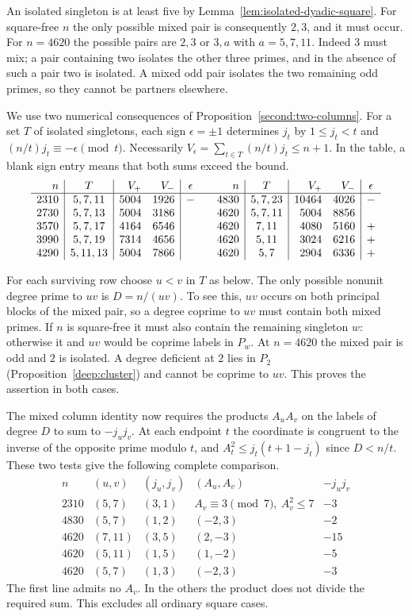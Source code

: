 \documentclass[11pt,a4paper]{article}
\numberwithin{equation}{section}
\theoremstyle{remark}
\begin{document}
An isolated singleton is at least five by Lemma~\ref{lem:isolated-dyadic-square}.
For square-free $n$ the only possible mixed pair is consequently
$2,3$, and it must occur. For $n=4620$ the possible pairs are $2,3$
or $3,a$ with $a=5,7,11$. Indeed $3$ must mix; a pair containing two
isolates the other three primes, and in the absence of such a pair
two is isolated. A mixed odd pair isolates the two remaining odd
primes, so they cannot be partners elsewhere.

We use two numerical consequences of Proposition~\ref{second:two-columns}.
For a set $T$ of isolated singletons, each sign $\epsilon=\pm1$
determines $j_t$ by $1\le j_t<t$ and $(n/t)j_t\equiv-\epsilon\pmod t$.
Necessarily $V_\epsilon=\sum_{t\in T}(n/t)j_t\le n+1$.
In the table, a blank sign entry means that both sums exceed the bound.
\[
\begin{array}{r|c|rr|c@{\qquad}r|c|rr|c}
 n&T&V_+&V_-&\epsilon &n&T&V_+&V_-&\epsilon\\\hline
2310&5,7,11&5004&1926&- &4830&5,7,23&10464&4026&-\\
2730&5,7,13&5004&3186& &4620&5,7,11&5004&8856&\\
3570&5,7,17&4164&6546& &4620&7,11&4080&5160&+\\
3990&5,7,19&7314&4656& &4620&5,11&3024&6216&+\\
4290&5,11,13&5004&7866& &4620&5,7&2904&6336&+
\end{array}
\]

For each surviving row choose $u<v$ in $T$ as below. The only possible
nonunit degree prime to $uv$ is $D=n/(uv)$. To see this, $uv$ occurs on
both principal blocks of the mixed pair, so a degree coprime to $uv$
must contain both mixed primes. If $n$ is square-free it must also
contain the remaining singleton $w$: otherwise it and $uv$ would be
coprime labels in $P_w$. At $n=4620$ the mixed pair is odd and $2$
is isolated. A degree deficient at $2$ lies in $P_2$
(Proposition~\ref{deep:cluster}) and cannot be coprime to $uv$.
This proves the assertion in both cases.

The mixed column identity now requires the products $A_u A_v$ on the
labels of degree $D$ to sum to $-j_uj_v$. At each endpoint $t$
the coordinate is congruent to the inverse of the opposite prime
modulo $t$, and $A_t^2\le j_t(t+1-j_t)$ since $D<n/t$. These two
tests give the following complete comparison.
\[
\begin{array}{r|c|c|c|c}
 n&(u,v)&(j_u,j_v)&(A_u,A_v)& -j_uj_v\\\hline
2310&(5,7)&(3,1)& A_v\equiv3\pmod7,\ A_v^2\le7&-3\\
4830&(5,7)&(1,2)&(-2,3)&-2\\
4620&(7,11)&(3,5)&(2,-3)&-15\\
4620&(5,11)&(1,5)&(1,-2)&-5\\
4620&(5,7)&(1,3)&(-2,3)&-3
\end{array}
\]
The first line admits no $A_v$. In the others the product does not
divide the required sum. This excludes all ordinary square cases.
\end{document}
